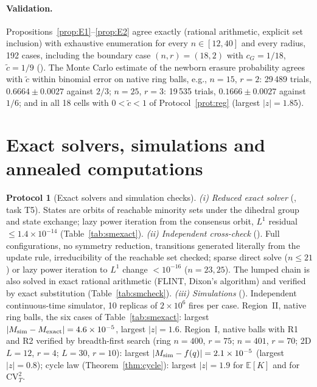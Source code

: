 \documentclass[aps,pre,onecolumn,superscriptaddress,amsmath,amssymb,longbibliography]{revtex4-2}
\theoremstyle{definition}
\newtheorem{protocol}[theorem]{Protocol}
\theoremstyle{remark}
\newcommand{\ctil}{\tilde c}
\newcommand{\cG}{c_G}
\newcommand{\E}{\mathbb{E}}
\begin{document}
\paragraph*{Validation.} Propositions~\ref{prop:E1}--\ref{prop:E2} agree
exactly (rational arithmetic, explicit set inclusion) with exhaustive
enumeration for every $n\in[12,40]$ and every radius, 192 cases,
including the boundary case $(n,r)=(18,2)$ with $\cG=1/18$, $\ctil=1/9$
(). The Monte Carlo
estimate of the newborn erasure probability agrees with $\ctil$ within
binomial error on native ring balls, e.g., $n=15$, $r=2$: 29\,489 trials,
$0.6664\pm0.0027$ against $2/3$; $n=25$, $r=3$: 19\,535 trials,
$0.1666\pm0.0027$ against $1/6$; and in all 18 cells with $0<\ctil<1$ of
Protocol~\ref{prot:reg} (largest $|z|=1.85$).

\section{Exact solvers, simulations and annealed computations}
\label{sec:S6}

\begin{protocol}[Exact solvers and simulation checks]
\label{prot:exact}
\emph{(i) Reduced exact solver} (,
task T5). States are orbits of reachable minority sets under the
dihedral group and state exchange; lazy power iteration from the
consensus orbit, $L^1$ residual $\le1.4\times10^{-14}$
(Table~\ref{tab:smexact}).
\emph{(ii) Independent cross-check}
(). Full
configurations, no symmetry reduction, transitions generated literally
from the update rule, irreducibility of the reachable set checked; sparse
direct solve ($n\le21$) or lazy power iteration to $L^1$ change
$<10^{-16}$ ($n=23,25$). The lumped chain is also solved in exact
rational arithmetic (FLINT, Dixon's algorithm) and verified by exact
substitution (Table~\ref{tab:smcheck}).
\emph{(iii) Simulations} ().
Independent continuous-time simulator, 10 replicas of $2\times10^6$
fires per case. Region~II, native ring balls, the six cases of
Table~\ref{tab:smexact}: largest $|M_{\rm sim}-M_{\rm exact}|=4.6\times10^{-5}$,
largest $|z|=1.6$. Region~I, native balls with R1 and R2 verified by
breadth-first search (ring $n=400$, $r=75$; $n=401$, $r=70$; 2D $L=12$,
$r=4$; $L=30$, $r=10$): largest $|M_{\rm sim}-f(q)|=2.1\times10^{-5}$
(largest $|z|=0.8$); cycle law (Theorem~\ref{thm:cycle}): largest
$|z|=1.9$ for $\E[K]$ and for $\mathrm{CV}_T^2$.
\end{protocol}
\end{document}
